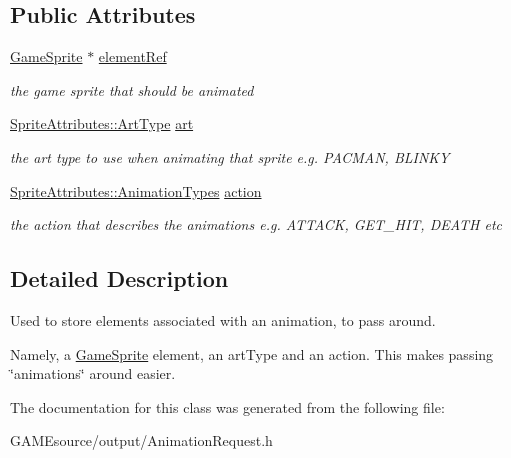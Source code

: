 \subsection*{Public Attributes}
\begin{DoxyCompactItemize}
\item 
\mbox{\label{class_animation_request_a19268057ef6e54182100a867562f0257}} 
\mbox{\hyperlink{class_game_sprite}{Game\+Sprite}} $\ast$ \mbox{\hyperlink{class_animation_request_a19268057ef6e54182100a867562f0257}{element\+Ref}}
\begin{DoxyCompactList}\small\item\em the game sprite that should be animated \end{DoxyCompactList}\item 
\mbox{\label{class_animation_request_ab9a0f52c95028927296ede79eb2617a2}} 
\mbox{\hyperlink{namespace_sprite_attributes_afb5447c311bc29f0ce8ddfd025c6e998}{Sprite\+Attributes\+::\+Art\+Type}} \mbox{\hyperlink{class_animation_request_ab9a0f52c95028927296ede79eb2617a2}{art}}
\begin{DoxyCompactList}\small\item\em the art type to use when animating that sprite e.\+g. P\+A\+C\+M\+AN, B\+L\+I\+N\+KY \end{DoxyCompactList}\item 
\mbox{\label{class_animation_request_ac640d080a7ad87b455fed6ce3aed3242}} 
\mbox{\hyperlink{namespace_sprite_attributes_ae1a753cb32f500b34381aac4b197b3a7}{Sprite\+Attributes\+::\+Animation\+Types}} \mbox{\hyperlink{class_animation_request_ac640d080a7ad87b455fed6ce3aed3242}{action}}
\begin{DoxyCompactList}\small\item\em the action that describes the animations e.\+g. A\+T\+T\+A\+CK, G\+E\+T\+\_\+\+H\+IT, D\+E\+A\+TH etc \end{DoxyCompactList}\end{DoxyCompactItemize}


\subsection{Detailed Description}
Used to store elements associated with an animation, to pass around. 

Namely, a \mbox{\hyperlink{class_game_sprite}{Game\+Sprite}} element, an art\+Type and an action. This makes passing \char`\"{}animations\char`\"{} around easier. 

The documentation for this class was generated from the following file\+:\begin{DoxyCompactItemize}
\item 
G\+A\+M\+Esource/output/Animation\+Request.\+h\end{DoxyCompactItemize}
